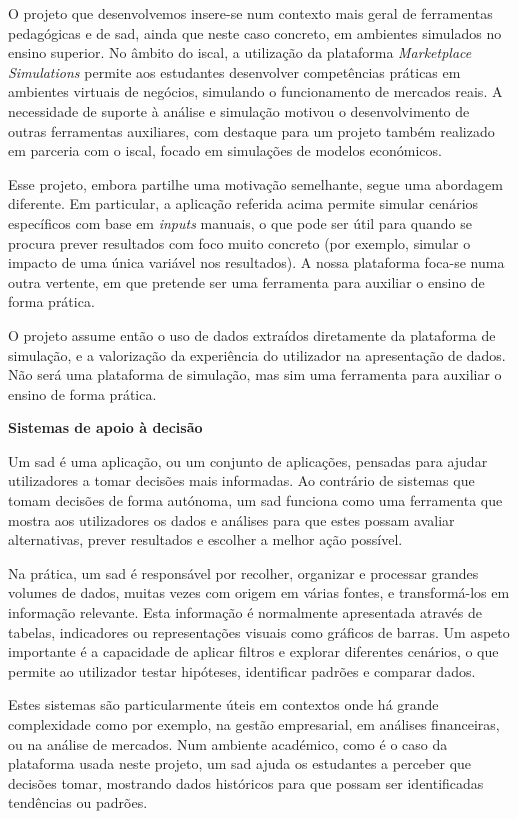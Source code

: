 O projeto que desenvolvemos insere-se num contexto mais geral de ferramentas pedagógicas e de \gls{sad}, ainda que neste caso concreto, em ambientes simulados no ensino superior. No âmbito do \gls{iscal}, a utilização da plataforma \textit{Marketplace Simulations} \cite{MarketplaceSim_2025} permite aos estudantes desenvolver competências práticas em ambientes virtuais de negócios, simulando o funcionamento de mercados reais. A necessidade de suporte à análise e simulação motivou o desenvolvimento de outras ferramentas auxiliares, com destaque para um projeto também realizado em parceria com o \gls{iscal}, focado em simulações de modelos económicos.

Esse projeto, embora partilhe uma motivação semelhante, segue uma abordagem diferente. Em particular, a aplicação referida acima permite simular cenários específicos com base em \textit{inputs} manuais, o que pode ser útil para quando se procura prever resultados com foco muito concreto (por exemplo, simular o impacto de uma única variável nos resultados). A nossa plataforma foca-se numa outra vertente, em que pretende ser uma ferramenta para auxiliar o ensino de forma prática.

O projeto assume então o uso de dados extraídos diretamente da plataforma de simulação, e a valorização da experiência do utilizador na apresentação de dados. Não será uma plataforma de simulação, mas sim uma ferramenta para auxiliar o ensino de forma prática.

\noindent \textbf{Sistemas de apoio à decisão}
\label{sec:sad}

Um \gls{sad} é uma aplicação, ou um conjunto de aplicações, pensadas para ajudar utilizadores a tomar decisões mais informadas. Ao contrário de sistemas que tomam decisões de forma autónoma, um \gls{sad} funciona como uma ferramenta que mostra aos utilizadores os dados e análises para que estes possam avaliar alternativas, prever resultados e escolher a melhor ação possível.

Na prática, um \gls{sad} é responsável por recolher, organizar e processar grandes volumes de dados, muitas vezes com origem em várias fontes, e transformá-los em informação relevante. Esta informação é normalmente apresentada através de tabelas, indicadores ou representações visuais como gráficos de barras. Um aspeto importante é a capacidade de aplicar filtros e explorar diferentes cenários, o que permite ao utilizador testar hipóteses, identificar padrões e comparar dados.

Estes sistemas são particularmente úteis em contextos onde há grande complexidade como por exemplo, na gestão empresarial, em análises financeiras, ou na análise de mercados. Num ambiente académico, como é o caso da plataforma usada neste projeto, um \gls{sad} ajuda os estudantes a perceber que decisões tomar, mostrando dados históricos para que possam ser identificadas tendências ou padrões.

